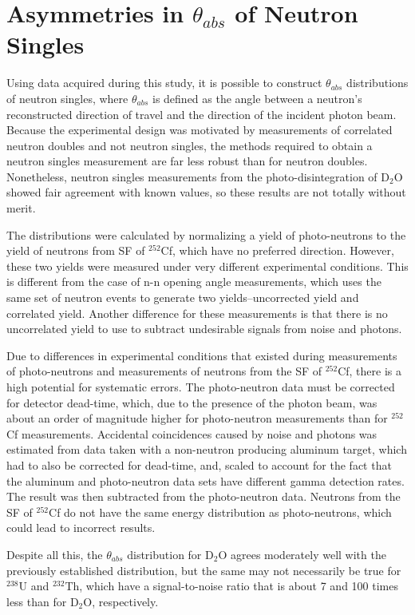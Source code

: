 \FloatBarrier 

\section{Asymmetries in $\theta_{abs}$ of Neutron Singles}
Using data acquired during this study, it is possible to construct $\theta_{abs}$ distributions of neutron singles, where $\theta_{abs}$ is defined as the angle between a neutron's reconstructed direction of travel and the direction of the incident photon beam.
Because the experimental design was motivated by measurements of correlated neutron doubles and not neutron singles, the methods required to obtain a neutron singles measurement are far less robust than for neutron doubles.
Nonetheless, neutron singles measurements from the photo-disintegration of D$_{2}$O showed fair agreement with known values, so these results are not totally without merit.

The distributions were calculated by normalizing a yield of photo-neutrons to the yield of neutrons from SF of $^{252}$Cf, which have no preferred direction.
However, these two yields were measured under very different experimental conditions.
This is different from the case of n-n opening angle measurements, which uses the same set of neutron events to generate two yields--uncorrected yield and correlated yield.
Another difference for these measurements is that there is no uncorrelated yield to use to subtract undesirable signals from noise and photons.

 Due to differences in experimental conditions that existed during measurements of photo-neutrons and measurements of neutrons from the SF of $^{252}$Cf, there is a high potential for systematic errors.
The photo-neutron data must be corrected for detector dead-time, which, due to the presence of the photon beam, was about an order of magnitude higher for photo-neutron measurements than for $^{252}$Cf measurements.
Accidental coincidences caused by noise and photons was estimated from data taken with a non-neutron producing aluminum target, which had to also be corrected for dead-time, and, scaled to account for the fact that the aluminum and photo-neutron data sets have different gamma detection rates.
The result was then subtracted from the photo-neutron data.
Neutrons from the SF of $^{252}$Cf do not have the same energy distribution as photo-neutrons, which could lead to incorrect results.

Despite all this, the $\theta_{abs}$ distribution for D$_{2}$O agrees moderately well with the previously established distribution, but the same may not necessarily be true for $^{238}$U and $^{232}$Th, which have a signal-to-noise ratio that is about 7 and 100 times less than for D$_{2}$O, respectively.

